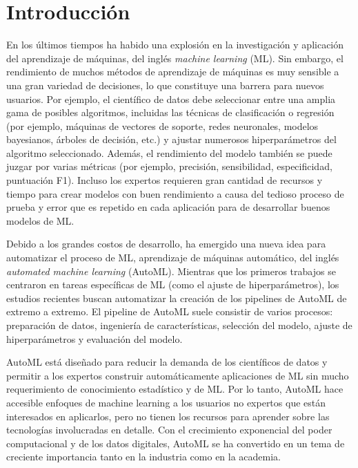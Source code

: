 \chapter*{Introducción}\label{chapter:introduction}

\qquad 

En los últimos tiempos ha habido una explosión en la investigación y aplicación del aprendizaje de máquinas, del inglés \textit{machine learning} (ML). Sin embargo, el rendimiento de muchos métodos de aprendizaje de máquinas es muy sensible a una gran variedad de decisiones, lo que constituye una barrera para nuevos usuarios. Por ejemplo, el científico de datos debe seleccionar entre una amplia gama de posibles algoritmos, incluidas las técnicas de clasificación o regresión (por ejemplo, máquinas de vectores de soporte, redes neuronales, modelos bayesianos, árboles de decisión, etc.) y ajustar numerosos hiperparámetros del algoritmo seleccionado. Además, el rendimiento del modelo también se puede juzgar por varias métricas (por ejemplo, precisión, sensibilidad, especificidad, puntuación F1). Incluso los expertos requieren gran cantidad de recursos y tiempo para crear modelos con buen rendimiento a causa del tedioso proceso de prueba y error que es repetido en cada aplicación para de desarrollar buenos modelos de ML.

Debido a los grandes costos de desarrollo, ha emergido una nueva idea para automatizar el proceso de ML, aprendizaje de máquinas automático, del inglés \textit{automated machine learning} (AutoML). Mientras que los primeros trabajos se centraron en tareas específicas de ML (como el ajuste de hiperparámetros), los estudios recientes buscan automatizar la creación de los pipelines de AutoML de extremo a extremo. El pipeline de AutoML suele consistir de varios procesos: preparación de datos, ingeniería de características, selección del modelo, ajuste de hiperparámetros y evaluación del modelo. 

AutoML está diseñado para reducir la demanda de los científicos de datos y permitir a los expertos construir automáticamente aplicaciones de ML sin mucho requerimiento de conocimiento estadístico y de ML. Por lo tanto, AutoML hace accesible enfoques de machine learning a los usuarios no expertos que están interesados en aplicarlos, pero no tienen los recursos para aprender sobre las tecnologías involucradas en detalle. Con el crecimiento exponencial del poder computacional y de los datos digitales, AutoML se ha convertido en un tema de creciente importancia tanto en la industria como en la academia.

